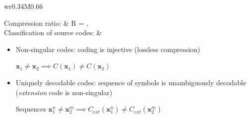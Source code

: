 \documentclass[10pt]{homework}
\newenvironment{mytable}
    { %
        \bgroup
        \centering
        \def\arraystretch{2.3}%
        \begin{longtable}{wr{0.34\textwidth}M{0.66\textwidth}}
    }
    { %
        \end{longtable}
        \egroup
    }
\newenvironment{mytextcol}
    { %
        \begin{minipage}[t]{0.6\textwidth}
    }
    { %
        \end{minipage}
    }
\begin{document}
\begin{mytable}
Compression ratio: & R = , \quad {}
\\
Classification of source codes: &
\begin{mytextcol}
\begin{itemize}
    \item Non-singular codes: coding is injective (lossless compression)
    
    $\bm x_1 \neq \bm x_2 \implies C(\bm x_1) \neq C(\bm x_2)$
    \item Uniquely decodable codes: sequence of symbols is unambiguously decodable (\emph{extension} code is non-singular)
    
    Sequences $\bm x_1^n \neq \bm x_2^m \implies C_{ext}(\bm x_1^n) \neq C_{ext}(\bm x_2^m)$
    

\end{itemize}
\end{mytextcol}
\end{mytable}
\end{document}

